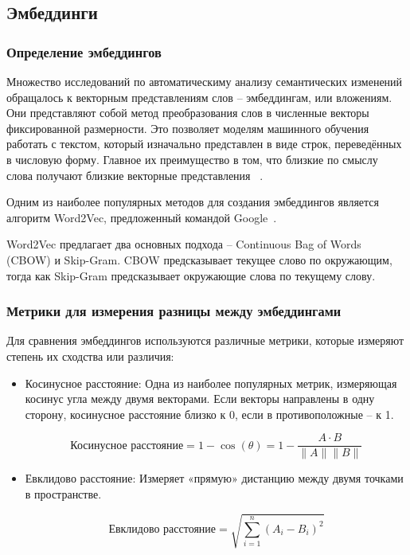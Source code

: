 \documentclass[LI,VKR]{HSEUniversity}
\begin{document}
\subsection{Эмбеддинги}

\subsubsection*{Определение эмбеддингов}

Множество исследований по автоматическиму анализу семантических изменений обращалось
к векторным представлениям слов – эмбеддингам, или вложениям.
Они представляют собой метод преобразования
слов в численные векторы фиксированной размерности.
Это позволяет моделям машинного обучения работать с текстом,
который изначально представлен в виде строк, переведённых в числовую форму.
Главное их преимущество в том, что близкие по смыслу слова получают близкие векторные представления
~\cite{Word2VecModelAnalysis}.

Одним из наиболее популярных методов для создания эмбеддингов является алгоритм Word2Vec,
предложенный командой Google~\cite{Word2VecOriginal}.

Word2Vec предлагает два основных подхода – Continuous Bag of Words (CBOW) и Skip-Gram.
CBOW предсказывает текущее слово по окружающим,
тогда как Skip-Gram предсказывает окружающие слова по текущему слову.

\subsubsection*{Метрики для измерения разницы между эмбеддингами}

Для сравнения эмбеддингов используются различные метрики, которые измеряют степень их сходства или различия:
\begin{itemize}
    \item Косинусное расстояние: Одна из наиболее популярных метрик, измеряющая косинус угла между двумя векторами.
Если векторы направлены в одну сторону, косинусное расстояние близко к 0, если в противоположные – к 1.

\[
\text{Косинусное расстояние} = 1 - \cos(\theta) = 1 - \frac{A \cdot B}{\|A\| \|B\|}
\]
    \item Евклидово расстояние: Измеряет «прямую» дистанцию между двумя точками в пространстве.

\[
\text{Евклидово расстояние} = \sqrt{\sum_{i=1}^{n} (A_i - B_i)^2}
\]
\end{itemize}
\end{document}
